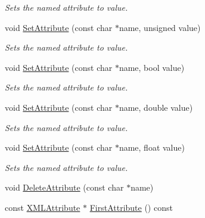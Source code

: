 \begin{DoxyCompactItemize}
\begin{DoxyCompactList}\small\item\em Sets the named attribute to value. \end{DoxyCompactList}\item 
void \hyperlink{classtinyxml2_1_1_x_m_l_element_ae143997e90064ba82326b29a9930ea8f}{Set\+Attribute} (const char $\ast$name, unsigned value)\hypertarget{classtinyxml2_1_1_x_m_l_element_ae143997e90064ba82326b29a9930ea8f}{}\label{classtinyxml2_1_1_x_m_l_element_ae143997e90064ba82326b29a9930ea8f}

\begin{DoxyCompactList}\small\item\em Sets the named attribute to value. \end{DoxyCompactList}\item 
void \hyperlink{classtinyxml2_1_1_x_m_l_element_aa848b696e6a75e4e545c6da9893b11e1}{Set\+Attribute} (const char $\ast$name, bool value)\hypertarget{classtinyxml2_1_1_x_m_l_element_aa848b696e6a75e4e545c6da9893b11e1}{}\label{classtinyxml2_1_1_x_m_l_element_aa848b696e6a75e4e545c6da9893b11e1}

\begin{DoxyCompactList}\small\item\em Sets the named attribute to value. \end{DoxyCompactList}\item 
void \hyperlink{classtinyxml2_1_1_x_m_l_element_a233397ee81e70eb5d4b814c5f8698533}{Set\+Attribute} (const char $\ast$name, double value)\hypertarget{classtinyxml2_1_1_x_m_l_element_a233397ee81e70eb5d4b814c5f8698533}{}\label{classtinyxml2_1_1_x_m_l_element_a233397ee81e70eb5d4b814c5f8698533}

\begin{DoxyCompactList}\small\item\em Sets the named attribute to value. \end{DoxyCompactList}\item 
void \hyperlink{classtinyxml2_1_1_x_m_l_element_a554b70d882e65b28fc084b23df9b9759}{Set\+Attribute} (const char $\ast$name, float value)\hypertarget{classtinyxml2_1_1_x_m_l_element_a554b70d882e65b28fc084b23df9b9759}{}\label{classtinyxml2_1_1_x_m_l_element_a554b70d882e65b28fc084b23df9b9759}

\begin{DoxyCompactList}\small\item\em Sets the named attribute to value. \end{DoxyCompactList}\item 
void \hyperlink{classtinyxml2_1_1_x_m_l_element_aebd45aa7118964c30b32fe12e944628a}{Delete\+Attribute} (const char $\ast$name)
\item 
const \hyperlink{classtinyxml2_1_1_x_m_l_attribute}{X\+M\+L\+Attribute} $\ast$ \hyperlink{classtinyxml2_1_1_x_m_l_element_a67593e63558ffda0386699c3e4cc0b2c}{First\+Attribute} () const \hypertarget{classtinyxml2_1_1_x_m_l_element_a67593e63558ffda0386699c3e4cc0b2c}{}\label{classtinyxml2_1_1_x_m_l_element_a67593e63558ffda0386699c3e4cc0b2c}


\end{DoxyCompactItemize}
